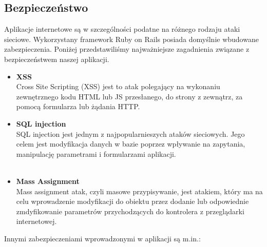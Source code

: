    \subsection{Bezpieczeństwo}
    Aplikacje internetowe są w szczególności podatne na różnego rodzaju ataki sieciowe. Wykorzystany framework Ruby on Rails posiada domyślnie wbudowane zabezpieczenia. Poniżej przedstawiliśmy najważniejsze zagadnienia związane z bezpieczeństwem naszej aplikacji.
      \begin{itemize}
        \item \textbf{XSS}\\
        Cross Site Scripting (XSS) jest to atak polegający na wykonaniu zewnętrznego kodu HTML lub JS przesłanego, do strony z zewnątrz, za pomocą formularza lub żądania HTTP.

        

        \item \textbf{SQL injection}\\
        SQL injection jest jednym z najpopularnieszych ataków sieciowych. Jego celem jest modyfikacja danych w bazie poprzez wpływanie na zapytania, manipulację parametrami i formularzami aplikacji.\\\\
        

        \item \textbf{Mass Assignment} \\
        Mass assignment atak, czyli masowe przypisywanie, jest atakiem, który ma na celu wprowadzenie modyfikacji do obiektu przez dodanie lub odpowiednie zmdyfikowanie parametrów przychodzących do kontrolera z przeglądarki internetowej.\\
        
      \end{itemize}
    Innymi zabezpieczeniami wprowadzonymi w aplikacji są m.in.:
